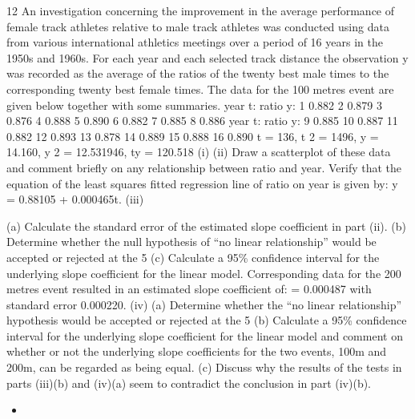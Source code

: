 \documentclass[a4paper,12pt]{article}
\begin{document}
\begin{enumerate}

12
An investigation concerning the improvement in the average performance of female
track athletes relative to male track athletes was conducted using data from various
international athletics meetings over a period of 16 years in the 1950s and 1960s. For
each year and each selected track distance the observation y was recorded as the
average of the ratios of the twenty best male times to the corresponding twenty best
female times.
The data for the 100 metres event are given below together with some summaries.
year t:
ratio y: 1
0.882 2
0.879 3
0.876 4
0.888 5
0.890 6
0.882 7
0.885 8
0.886
year t:
ratio y: 9
0.885 10
0.887 11
0.882 12
0.893 13
0.878 14
0.889 15
0.888 16
0.890
\sigma t = 136, \sigma t 2 = 1496, \sigma y = 14.160, \sigma y 2 = 12.531946, \sigma ty = 120.518
(i)
(ii)
Draw a scatterplot of these data and comment briefly on any relationship
between ratio and year.
Verify that the equation of the least squares fitted regression line of ratio on
year is given by:
y = 0.88105 + 0.000465t.
(iii)


(a) Calculate the standard error of the estimated slope coefficient in part
(ii).
(b) Determine whether the null hypothesis of “no linear relationship”
would be accepted or rejected at the 5%
(c) Calculate a 95\% confidence interval for the underlying slope
coefficient for the linear model.
Corresponding data for the 200 metres event resulted in an estimated slope coefficient
of:
\hat{\beta}= 0.000487 with standard error 0.000220.
(iv)
(a) Determine whether the “no linear relationship” hypothesis would be
accepted or rejected at the 5%
(b) Calculate a 95\% confidence interval for the underlying slope
coefficient for the linear model and comment on whether or not the
underlying slope coefficients for the two events, 100m and 200m, can
be regarded as being equal.
(c) Discuss why the results of the tests in parts (iii)(b) and (iv)(a) seem to
contradict the conclusion in part (iv)(b).

\newpage




\begin{itemize}
\item 


\end{itemize}
\end{enumerate}
\end{document}
